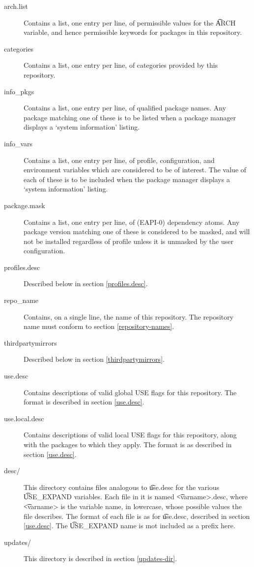 \begin{description}
\item[arch.list] \label{arch.list} Contains a list, one entry per line, of permissible values for
    the \t{ARCH} variable, and hence permissible keywords for packages in this repository.
\item[categories] \label{profiles-categories} Contains a list, one entry per line, of categories
    provided by this repository.
\item[info\_pkgs] Contains a list, one entry per line, of qualified package names. Any package
    matching one of these is to be listed when a package manager displays a `system information'
    listing.
\item[info\_vars] Contains a list, one entry per line, of profile, configuration, and environment
    variables which are considered to be of interest. The value of each of these is to be included
    when the package manager displays a `system information' listing.
\item[package.mask] \label{profiles-package.mask}
    Contains a list, one entry per line, of (EAPI-0) dependency atoms. Any package
    version matching one of these is considered to be masked, and will not be installed regardless
    of profile unless it is unmasked by the user configuration.
\item[profiles.desc] Described below in section \ref{profiles.desc}.
\item[repo\_name] Contains, on a single line, the name of this repository. The repository name must
    conform to section \ref{repository-names}.
\item[thirdpartymirrors] Described below in section \ref{thirdpartymirrors}.
\item[use.desc] Contains descriptions of valid global USE flags for this repository. The format is
    described in section \ref{use.desc}.
\item[use.local.desc] Contains descriptions of valid local USE flags for this repository, along with
    the packages to which they apply. The format is as described in section \ref{use.desc}.
\item[desc/] This directory contains files analogous to \t{use.desc} for the various \t{USE\_EXPAND}
    variables. Each file in it is named \t{<varname>.desc}, where \t{<varname>} is the variable
    name, in lowercase, whose possible values the file describes. The format of each file is as for
    \t{use.desc}, described in section \ref{use.desc}. The \t{USE\_EXPAND} name is \i{not}
    included as a prefix here.
\item[updates/] This directory is described in section \ref{updates-dir}.
\end{description}

